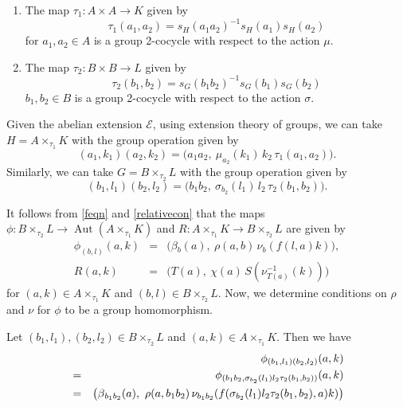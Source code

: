 \documentclass[11pt]{amsart}
\theoremstyle{thrm}
\theoremstyle{plain}
\theoremstyle{definition}
\newcommand{\Aut}{\operatorname{Aut} }
\numberwithin{equation}{section}
\begin{document}
\begin{enumerate}
\item The map $\tau_1: A \times A \rightarrow K$ given by
\begin{equation}\label{mucocycle}
\tau_1(a_1, a_2)= s_H(a_1 a_2)^{-1}s_H(a_1)s_H(a_2)
\end{equation}
for $a_1, a_2 \in A$ is a group 2-cocycle with respect to the action $\mu$.
\item The map $\tau_2: B \times B \rightarrow L$ given by
\begin{equation}\label{sigmacocycle}
	\tau_2(b_1, b_2)= s_G(b_1 b_2)^{-1}s_G(b_1)s_G(b_2)
\end{equation}
$b_1, b_2 \in B$ is a group 2-cocycle with respect to the action $\sigma$.
\end{enumerate}


Given the abelian extension $\mathcal{E}$, using extension theory of groups, we can take $H= A \times_{\tau_1} K $  with the group operation given by 
$$(a_1,k_1) (a_2, k_2)=\big(a_1 a_2,~ \mu_{a_2}(k_1)\, k_2\, \tau_1(a_1, a_2) \big).$$
Similarly, we can take $G=B \times_{\tau_2} L$ with the group operation given by
$$(b_1,l_1) (b_2, l_2)=\big(b_1 b_2, ~\sigma_{b_2}(l_1)\,l_2\, \tau_2(b_1, b_2)\big).$$

It follows from \eqref{feqn} and \eqref{relativecon} that the maps $\phi: B \times_{\tau_2} L \longrightarrow \Aut(A \times_{\tau_1} K )$ and  $R:  A \times_{\tau_1} K \longrightarrow B \times_{\tau_2} L$ are given by
\begin{eqnarray*}
\phi_{(b,l)}(a,k) &= & \big(\beta{_{b}(a)}, ~\rho(a,b) \,\nu_b(f(l,a)k)\big),\\
R(a,k) &= & \big(T(a), ~\chi(a) \, S(\nu^{-1}_{T(a)}(k))\big)
\end{eqnarray*} 
for $(a,k) \in A \times_{\tau_1} K$ and $(b,l) \in B \times_{\tau_2} L$. Now, we determine conditions on $\rho$ and $\nu$ for $\phi$ to be a group homomorphism. 

Let $(b_1,l_1), (b_2,l_2) \in B \times_{\tau_2} L$ and $(a,k) \in A \times_{\tau_1} K$. Then we have 
\begin{eqnarray}\label{iso1}
&& \phi_{(b_1,l_1) (b_2, l_2)}(a,k)\\
&=& \phi_{(b_1 b_2, \sigma_{b_2}(l_1)l_2\tau_2(b_1, b_2))}(a,k)\notag \\
&=& \big ( \beta{_{b_1 b_2}(a)},~ \rho(a, b_1 b_2) \,\nu_{b_1 b_2}( f(\sigma_{b_2}(l_1)l_2\tau_2(b_1, b_2), a)k)\big) \notag
\end{eqnarray} 
\end{document}
